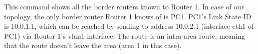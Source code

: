 

This command shows all the border routers known to Router 1. In case of our topology, the only border router Router 1 knows of is PC1. PC1's Link State ID is 10.0.1.1, which can be reached by sending to address 10.0.2.1 (interface eth1 of PC1) via Router 1's vlan1 interface. The route is an intra-area route, meaning that the route doesn't leave the area (area 1 in this case).